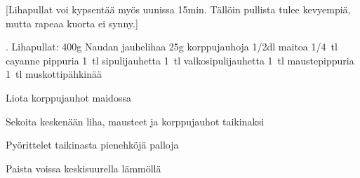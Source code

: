 [Lihapullat voi kypsentää myös uunissa  15min. Tällöin pullista tulee kevyempiä, mutta rapeaa kuorta ei synny.]

\begin{step}
. Lihapullat:
400g Naudan jauhelihaa
25g korppujauhoja
1/2dl maitoa
1/4~tl cayanne pippuria
1~tl sipulijauhetta
1~tl valkosipulijauhetta
1~tl maustepippuria
1~tl muskottipähkinää

\method
Liota korppujauhot maidossa

Sekoita keskenään liha, mausteet ja korppujauhot taikinaksi

Pyörittelet taikinasta pienehköjä palloja

Paista voissa keskisuurella lämmöllä
\end{step}
